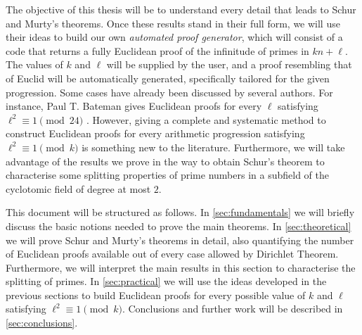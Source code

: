 \documentclass[../main.tex]{subfiles}
\begin{document}
The objective of this thesis will be to understand every detail that leads to Schur and Murty's theorems. Once these results stand in their full form, we will use their ideas to build our own \emph{automated proof generator}, which will consist of a code that returns a fully Euclidean proof of the infinitude of primes in $kn+\ell$. The values of $k$ and $\ell$ will be supplied by the user, and a proof resembling that of Euclid will be automatically generated, specifically tailored for the given progression. Some cases have already been discussed by several authors. For instance, Paul T. Bateman gives Euclidean proofs for every $\ell$ satisfying $\ell^2\equiv 1\pmod{24}$ \cite{Bateman}. However, giving a complete and systematic method to construct Euclidean proofs for every arithmetic progression satisfying $\ell^2\equiv 1\pmod{k}$ is something new to the literature. Furthermore, we will take advantage of the results we prove in the way to obtain Schur's theorem to characterise some splitting properties of prime numbers in a subfield of the cyclotomic field of degree at most $2$.

This document will be structured as follows. In \cref{sec:fundamentals} we will briefly discuss the basic notions needed to prove the main theorems. In \cref{sec:theoretical} we will prove Schur and Murty's theorems in detail, also quantifying the number of Euclidean proofs available out of every case allowed by Dirichlet Theorem. Furthermore, we will interpret the main results in this section to characterise the splitting of primes. In \cref{sec:practical} we will use the ideas developed in the previous sections to build Euclidean proofs for every possible value of $k$ and $\ell$ satisfying $\ell^2\equiv 1\pmod{k}$. Conclusions and further work will be described in \cref{sec:conclusions}.
\end{document}

